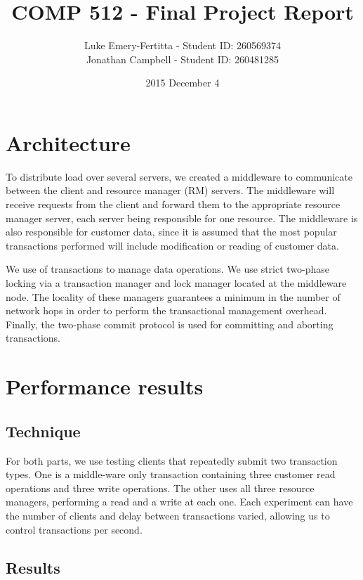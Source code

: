 \documentclass[11pt]{article}
\begin{document}
\title{COMP 512 - Final Project Report}
\author{Luke Emery-Fertitta - Student ID: 260569374 \\ Jonathan Campbell - Student ID: 260481285}
\date{2015 December 4}
\maketitle

\section*{Architecture}

To distribute load over several servers, we created a middleware to communicate between the client and resource manager (RM) servers. The middleware will receive requests from the client and forward them to the appropriate resource manager server, each server being responsible for one resource. The middleware is also responsible for customer data, since it is assumed that the most popular transactions performed will include modification or reading of customer data.  \par

We use of transactions to manage data operations. We use strict two-phase locking via a transaction manager and lock manager located at the middleware node. The locality of these managers guarantees a minimum in the number of network hops in order to perform the transactional management overhead. Finally, the two-phase commit protocol is used for committing and aborting transactions. \par

\section*{Performance results}

\subsection*{Technique}

For both parts, we use testing clients that repeatedly submit two transaction types. One is a middle-ware only transaction containing three customer read operations and three write operations. The other uses all three resource managers, performing a read and a write at each one. Each experiment can have the number of clients and delay between transactions varied, allowing us to control transactions per second.

\subsection*{Results}
\end{document}
